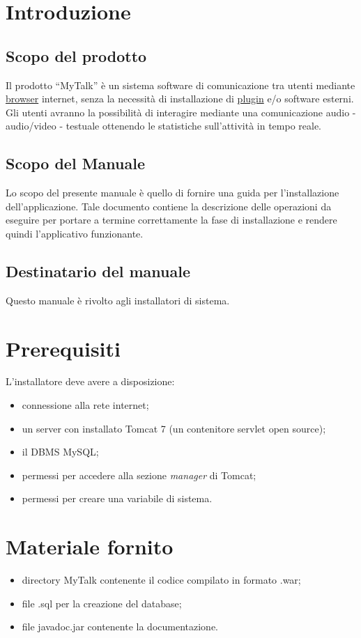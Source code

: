 \section{Introduzione}
\subsection{Scopo del prodotto}
Il prodotto ``MyTalk'' è un sistema software di comunicazione tra utenti mediante \underline{browser} internet, senza la necessità di installazione di \underline{plugin} e/o software esterni. Gli utenti avranno la possibilità di interagire mediante una comunicazione audio - audio/video - testuale ottenendo le statistiche sull'attività in tempo reale.

\subsection{Scopo del Manuale}
Lo scopo del presente manuale è quello di fornire una guida per l'installazione dell'applicazione. Tale documento contiene la descrizione delle operazioni da eseguire per portare a termine correttamente la fase di installazione e rendere quindi l'applicativo funzionante.

\subsection{Destinatario del manuale}
Questo manuale è rivolto agli installatori di sistema.

\section{Prerequisiti}
L'installatore deve avere a disposizione:
\begin{itemize}
\item connessione alla rete internet;
\item un server con installato Tomcat 7 (un contenitore servlet open source);
\item il DBMS MySQL;
\item permessi per accedere alla sezione \textit{manager} di Tomcat;
\item permessi per creare una variabile di sistema.
\end{itemize} 

\section{Materiale fornito}
\begin{itemize}
\item directory MyTalk contenente il codice compilato in formato .war;
\item file .sql per la creazione del database;
\item file javadoc.jar contenente la documentazione.
\end{itemize}

